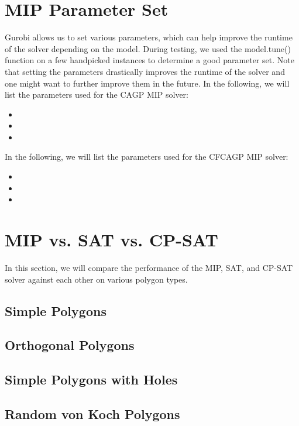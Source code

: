 \section{MIP Parameter Set}
Gurobi allows us to set various parameters, which can help improve the runtime of the solver depending on the model. During testing, we used the model.tune() function on a few handpicked instances to determine a good parameter set. Note that setting the parameters drastically improves the runtime of the solver and one might want to further improve them in the future. In the following, we will list the parameters used for the CAGP MIP solver:
\begin{itemize}
  \item 
  \item 
  \item 
\end{itemize}
In the following, we will list the parameters used for the CFCAGP MIP solver:
\begin{itemize}
  \item 
  \item 
  \item 
\end{itemize}

\section{MIP vs. SAT vs. CP-SAT}
In this section, we will compare the performance of the MIP, SAT, and CP-SAT solver against each other on various polygon types.

\subsection{Simple Polygons}

\subsection{Orthogonal Polygons}

\subsection{Simple Polygons with Holes}

\subsection{Random von Koch Polygons}
